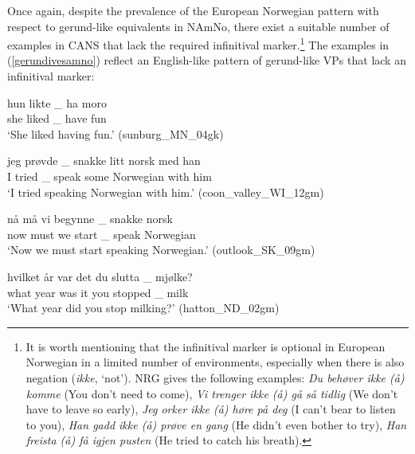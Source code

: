 \documentclass[output=paper,colorlinks,citecolor=brown]{langscibook}
\begin{document}
Once again, despite the prevalence of the European Norwegian pattern with respect to gerund-like equivalents in NAmNo, there exist a suitable number of examples in CANS that lack the required infinitival marker.\footnote{It is worth mentioning that the infinitival marker is optional in European Norwegian in a limited number of environments, especially when there is also negation (\textit{ikke}, `not'). NRG \citep[995]{faaretal97} gives the following examples: \textit{Du behøver ikke (å) komme} (You don't need to come), \textit{Vi trenger ikke (å) gå så tidlig} (We don't have to leave so early), \textit{Jeg orker ikke (å) høre på deg} (I can't bear to listen to you), \textit{Han gadd ikke (å) prøve en gang} (He didn't even bother to try), \textit{Han freista (å) få igjen pusten} (He tried to catch  his breath).} The examples in (\ref{gerundivesamno}) reflect an English-like pattern of gerund-like VPs that lack an infinitival marker: 


\begin{exe} 
\item \label{gerundivesamno}

\begin{xlist}

\item \label{gerundives1} \gll hun likte \_ ha moro \\
        she liked \_ have fun \\
         \glt `She liked having fun.' \hfill(sunburg\_MN\_04gk)

\item \label{gerundives2} \gll jeg prøvde \_ snakke litt norsk med han \\
        I tried \_ speak some Norwegian with him \\
         \glt `I tried speaking Norwegian with him.' \hfill(coon\_valley\_WI\_12gm)

\item \label{gerundives3} \gll nå må vi begynne \_ snakke norsk \\
        now must we start \_ speak Norwegian \\
         \glt `Now we must start speaking Norwegian.' \hfill(outlook\_SK\_09gm)
         
\item \label{gerundives4} \gll hvilket år var det du slutta \_ mjølke? \\
        what year was it you stopped \_ milk \\
         \glt `What year did you stop milking?' \hfill(hatton\_ND\_02gm)

\end{xlist}
\end{exe}
\end{document}
